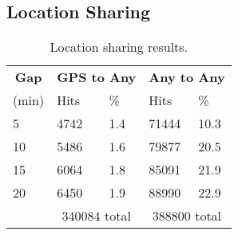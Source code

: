 \subsection{Location Sharing}
\label{subsec-locationsharing}

\begin{table}[t]
\begin{tabularx}{\columnwidth}{XXXXX}
\multicolumn{1}{c}{\normalsize{\textbf{Gap}}} &
\multicolumn{2}{c}{\normalsize{\textbf{GPS to Any}}} &
\multicolumn{2}{c}{\normalsize{\textbf{Any to Any}}} \\
\multicolumn{1}{c}{(min)} &
\multicolumn{1}{l}{Hits} &
\multicolumn{1}{l}{\%} &
\multicolumn{1}{l}{Hits} &
\multicolumn{1}{l}{\%} \\
\toprule
5 & \num{4742} & 1.4 & \num{71444} & 10.3 \\
10 & \num{5486} & 1.6 & \num{79877} & 20.5 \\
15 & \num{6064} & 1.8 & \num{85091} & 21.9 \\
20 & \num{6450} & 1.9 & \num{88990} & 22.9 \\
\midrule
& \multicolumn{2}{c}{\num{340084} total}
& \multicolumn{2}{c}{\num{388800} total} \\
\end{tabularx}
\caption{Location sharing results.}
\label{table-locationsharing}
\end{table}

%
%
